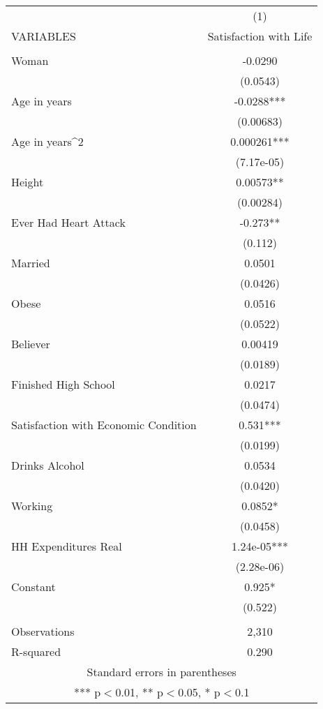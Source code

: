 \documentclass[]{article}
\begin{document}
\begin{tabular}{lc} \hline
 & (1) \\
VARIABLES & Satisfaction with Life \\ \hline
 &  \\
Woman & -0.0290 \\
 & (0.0543) \\
Age in years & -0.0288*** \\
 & (0.00683) \\
Age in years^2 & 0.000261*** \\
 & (7.17e-05) \\
Height & 0.00573** \\
 & (0.00284) \\
Ever Had Heart Attack & -0.273** \\
 & (0.112) \\
Married & 0.0501 \\
 & (0.0426) \\
Obese & 0.0516 \\
 & (0.0522) \\
Believer & 0.00419 \\
 & (0.0189) \\
Finished High School & 0.0217 \\
 & (0.0474) \\
Satisfaction with Economic Condition & 0.531*** \\
 & (0.0199) \\
Drinks Alcohol & 0.0534 \\
 & (0.0420) \\
Working & 0.0852* \\
 & (0.0458) \\
HH Expenditures Real & 1.24e-05*** \\
 & (2.28e-06) \\
Constant & 0.925* \\
 & (0.522) \\
 &  \\
Observations & 2,310 \\
 R-squared & 0.290 \\ \hline
\multicolumn{2}{c}{ Standard errors in parentheses} \\
\multicolumn{2}{c}{ *** p$<$0.01, ** p$<$0.05, * p$<$0.1} \\
\end{tabular}
\end{document}
